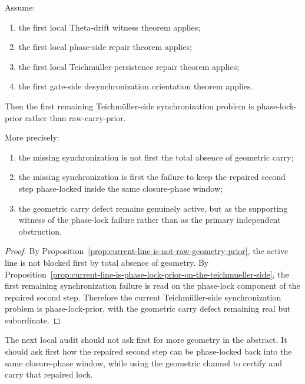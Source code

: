 \begin{theorem}
\label{thm:first-teichmueller-side-synchronization-orientation-theorem}
Assume:
\begin{enumerate}[leftmargin=2em,label=(\alph*)]
  \item the first local Theta-drift witness theorem applies;
  \item the first local phase-side repair theorem applies;
  \item the first local Teichm\"uller-persistence repair theorem applies;
  \item the first gate-side desynchronization orientation theorem applies.
\end{enumerate}
Then the first remaining Teichm\"uller-side synchronization problem is phase-lock-prior rather than raw-carry-prior.

More precisely:
\begin{enumerate}[leftmargin=2em,label=(\roman*)]
  \item the missing synchronization is not first the total absence of geometric carry;
  \item the missing synchronization is first the failure to keep the repaired second step phase-locked inside the same closure-phase window;
  \item the geometric carry defect remains genuinely active, but as the supporting witness of the phase-lock failure rather than as the primary independent obstruction.
\end{enumerate}
\end{theorem}

\begin{proof}
By Proposition~\ref{prop:current-line-is-not-raw-geometry-prior}, the active line is not blocked first by total absence of geometry. By Proposition~\ref{prop:current-line-is-phase-lock-prior-on-the-teichmueller-side}, the first remaining synchronization failure is read on the phase-lock component of the repaired second step. Therefore the current Teichm\"uller-side synchronization problem is phase-lock-prior, with the geometric carry defect remaining real but subordinate.
\end{proof}

\begin{corollary}
\label{cor:current-teichmueller-side-synchronization-working-rule}
The next local audit should not ask first for more geometry in the abstract. It should ask first how the repaired second step can be phase-locked back into the same closure-phase window, while using the geometric channel to certify and carry that repaired lock.
\end{corollary}

